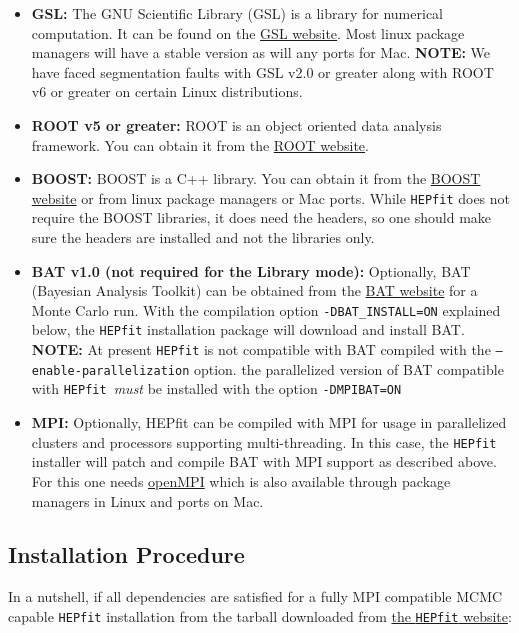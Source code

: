 \documentclass[preprint,3p,12pt]{elsarticle}
\newcommand{\HEPfit}{\texttt{HEPfit}\xspace}
\begin{document}
\begin{itemize}
\item {\bf GSL:}  The GNU Scientific Library (GSL) is a library for numerical computation. It can be found on the \href{http://www.gnu.org/software/gsl/}{GSL website}. Most linux package managers will have a stable version as will any ports for Mac. {\bf NOTE:} We have faced segmentation faults with GSL v2.0 or greater along with ROOT v6 or greater on certain Linux distributions.

\item {\bf ROOT v5 or greater:}  ROOT is an object oriented data analysis framework. You can obtain it from the \href{http://root.cern.ch/}{ROOT website}.

\item {\bf BOOST:}  BOOST is a C++ library. You can obtain it from the \href{http://www.boost.org}{BOOST website} or from linux package managers or Mac ports. While \HEPfit does not require the BOOST libraries, it does need the headers, so one should make sure the headers are installed and not the libraries only. 

\item {\bf BAT v1.0 (not required for the Library mode):} Optionally, BAT (Bayesian Analysis Toolkit) can be obtained from 
    the \href{https://www.mppmu.mpg.de/bat/}{BAT website} for a Monte Carlo run. With the compilation 
    option \texttt{-DBAT\_INSTALL=ON} explained below, the \HEPfit installation package 
    will download and install BAT. {\bf NOTE:} At present \HEPfit is not
    compatible with BAT compiled with the \texttt{--enable-parallelization} option. the parallelized version of BAT compatible with \HEPfit\ {\em must} be installed with the option \texttt{-DMPIBAT=ON}

\item {\bf MPI:}    Optionally, HEPfit can be compiled with MPI for usage in parallelized  
    clusters and processors supporting multi-threading. In this case,
    the \HEPfit installer will patch and compile BAT with MPI support as described above. For this one needs \href{https://www.open-mpi.org/}{openMPI} which is also available through package managers in Linux and ports on Mac.
\end{itemize}

\subsection{Installation Procedure}

In a nutshell, if all dependencies are satisfied for a fully MPI compatible MCMC capable \HEPfit installation from the tarball downloaded from \href{http://hepfit.roma1.infn.it/}{the \HEPfit website}:
\end{document}
